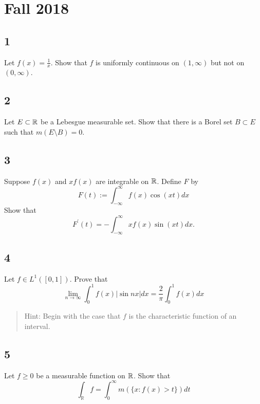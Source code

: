 \hypertarget{fall-2018}{%
\section{Fall 2018}\label{fall-2018}}

\hypertarget{section}{%
\subsection{1}\label{section}}

Let \(f(x) = \frac 1 x\). Show that \(f\) is uniformly continuous on
\((1, \infty)\) but not on \((0,\infty)\).

\hypertarget{section-1}{%
\subsection{2}\label{section-1}}

Let \(E\subset {\mathbb{R}}\) be a Lebesgue measurable set. Show that there is a
Borel set \(B \subset E\) such that \(m(E\setminus B) = 0\).

\hypertarget{section-2}{%
\subsection{3}\label{section-2}}

Suppose \(f(x)\) and \(xf(x)\) are integrable on \({\mathbb{R}}\). Define \(F\)
by \[
F(t):=\int_{-\infty}^{\infty} f(x) \cos (x t) d x
\] Show that \[
F^{\prime}(t)=-\int_{-\infty}^{\infty} x f(x) \sin (x t) d x.
\]

\hypertarget{section-3}{%
\subsection{4}\label{section-3}}

Let \(f\in L^1([0, 1])\). Prove that \[
\lim _{n \rightarrow \infty} \int_{0}^{1} f(x)|\sin n x| d x=\frac{2}{\pi} \int_{0}^{1} f(x) d x
\]

\begin{quote}
Hint: Begin with the case that \(f\) is the characteristic function of
an interval.
\end{quote}

\hypertarget{section-4}{%
\subsection{5}\label{section-4}}

Let \(f \geq 0\) be a measurable function on \({\mathbb{R}}\). Show that \[
\int_{\mathbb{R}} f=\int_{0}^{\infty} m(\{x: f(x)>t\}) d t
\]

